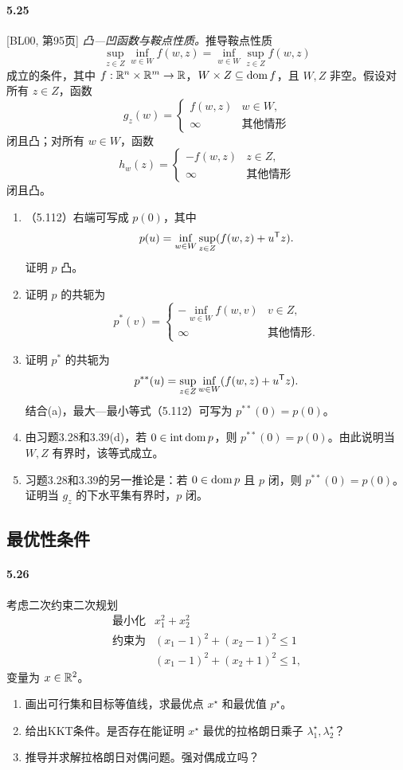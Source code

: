 \paragraph{5.25} [BL00, 第95页] \emph{凸—凹函数与鞍点性质。}推导鞍点性质
\begin{equation}
\sup_{z\in Z}\inf_{w\in W}f(w,z)
=\inf_{w\in W}\sup_{z\in Z}f(w,z)\tag{5.112}
\end{equation}
成立的条件，其中 $f:\mathbb R^n\times\mathbb R^m\to\mathbb R$，$W\times Z\subseteq\operatorname{dom} f$，且 $W,Z$ 非空。假设对所有 $z\in Z$，函数
\[
g_z(w)=\begin{cases}f(w,z)&w\in W,\\
\infty&\text{其他情形}\end{cases}
\]
闭且凸；对所有 $w\in W$，函数
\[
h_w(z)=\begin{cases}-f(w,z)&z\in Z,\\
\infty&\text{其他情形}\end{cases}
\]
闭且凸。
\begin{enumerate}[label=(\alph*)]
\item （5.112）右端可写成 $p(0)$，其中
\[
p(u)=\inf_{w\in W}\sup_{z\in Z}(f(w,z)+u^\mathsf T z).
\]
证明 $p$ 凸。

\item 证明 $p$ 的共轭为
\[
p^*(v)=\begin{cases}
-\inf_{w\in W}f(w,v)&v\in Z,\\
\infty&\text{其他情形}.
\end{cases}
\]
\item 证明 $p^*$ 的共轭为
\[
p^{**}(u)=\sup_{z\in Z}\inf_{w\in W}(f(w,z)+u^\mathsf T z).
\]
结合(a)，最大—最小等式（5.112）可写为 $p^{**}(0)=p(0)$。
\item 由习题3.28和3.39(d)，若 $0\in\operatorname{int}\operatorname{dom} p$，则 $p^{**}(0)=p(0)$。由此说明当 $W,Z$ 有界时，该等式成立。
\item 习题3.28和3.39的另一推论是：若 $0\in\operatorname{dom} p$ 且 $p$ 闭，则 $p^{**}(0)=p(0)$。证明当 $g_z$ 的下水平集有界时，$p$ 闭。
\end{enumerate}

\subsection*{最优性条件}
\paragraph{5.26} 考虑二次约束二次规划
\[
\begin{array}{ll}\text{最小化}&x_1^2+x_2^2\\
\text{约束为}&(x_1-1)^2+(x_2-1)^2\le1\\
&(x_1-1)^2+(x_2+1)^2\le1,\end{array}
\]
变量为 $x\in\mathbb R^2$。
\begin{enumerate}[label=(\alph*)]
\item 画出可行集和目标等值线，求最优点 $x^\star$ 和最优值 $p^\star$。
\item 给出KKT条件。是否存在能证明 $x^\star$ 最优的拉格朗日乘子 $\lambda_1^\star,\lambda_2^\star$？
\item 推导并求解拉格朗日对偶问题。强对偶成立吗？
\end{enumerate}

